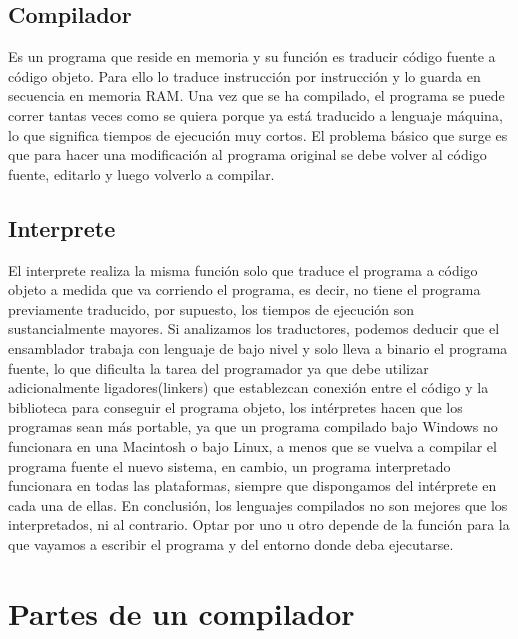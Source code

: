 \subsection{Compilador}

Es un programa que reside en memoria y su función es traducir código fuente a código objeto. Para ello lo traduce instrucción por instrucción y lo guarda en secuencia en memoria RAM. Una vez que se ha compilado, el programa se puede correr tantas veces como se quiera porque ya está  traducido a lenguaje máquina, lo que significa tiempos de ejecución muy cortos. El problema básico que surge es que para hacer una modificación al programa original se debe volver al código fuente, editarlo y luego volverlo a compilar.

\subsection{Interprete}

El interprete realiza la misma función solo que traduce el programa a código objeto a medida que va corriendo el programa, es decir, no tiene el programa previamente traducido, por supuesto, los tiempos de ejecución son sustancialmente mayores.
Si analizamos los traductores, podemos deducir que el ensamblador  trabaja con lenguaje de bajo nivel y solo lleva a binario el programa fuente, lo que dificulta la tarea del programador ya que debe utilizar adicionalmente ligadores(linkers) que establezcan conexión entre el código y la biblioteca  para conseguir el programa objeto, los intérpretes hacen que los programas sean más portable, ya que un programa compilado bajo Windows no funcionara en una Macintosh o bajo Linux, a menos que se vuelva a compilar el programa fuente el nuevo sistema, en cambio, un programa interpretado funcionara en todas las plataformas, siempre que dispongamos del intérprete en cada una de ellas.
En conclusión, los lenguajes compilados no son mejores que los interpretados, ni al contrario. Optar por uno u otro depende de la función para la que vayamos a escribir el programa y del entorno donde deba ejecutarse.

\section{Partes de un compilador}

